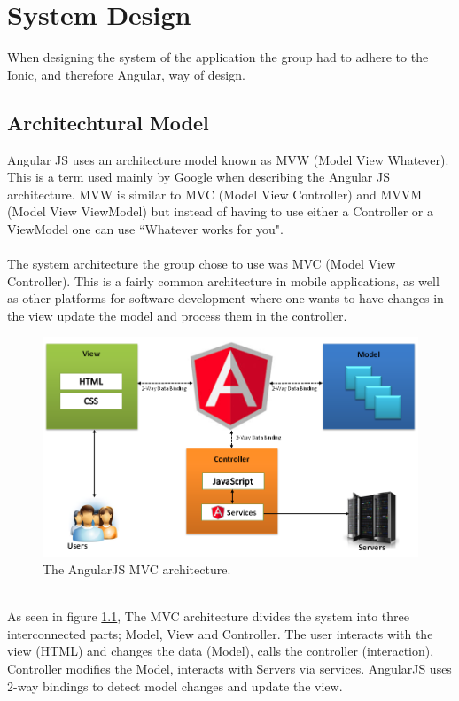 \chapter{System Design}
When designing the system of the application the group had to adhere to the Ionic, and therefore Angular, way of design.

\section{Architechtural Model}
Angular JS uses an architecture model known as MVW (Model View Whatever). This is a term used mainly by Google when describing the Angular JS architecture.\cite{mvw} MVW is similar to MVC (Model View Controller) \cite{mvc} and MVVM (Model View ViewModel)  \cite{mvvm}but instead of having to use either a Controller or  a ViewModel one can use ``Whatever works for you".\\
\\
The system architecture the group chose to use was MVC (Model View Controller).
This is a fairly common architecture in mobile applications, as well as other platforms for software development where one wants to have changes in the view update the model and process them in the controller.
\\
\begin{figure}[h]
    \centering
    \includegraphics[scale=0.5]{images/MVC_angular.png}
    \caption{The AngularJS MVC architecture.}
    \label{fig:MVC}
\end{figure}
\\
As seen in figure \ref{fig:MVC}, The MVC architecture divides the system into three interconnected parts; Model, View and Controller.
The user interacts with the view (HTML) and changes the data (Model), calls the controller (interaction), Controller modifies the Model, interacts with Servers via services. AngularJS uses 2-way bindings to detect model changes and update the view. 
